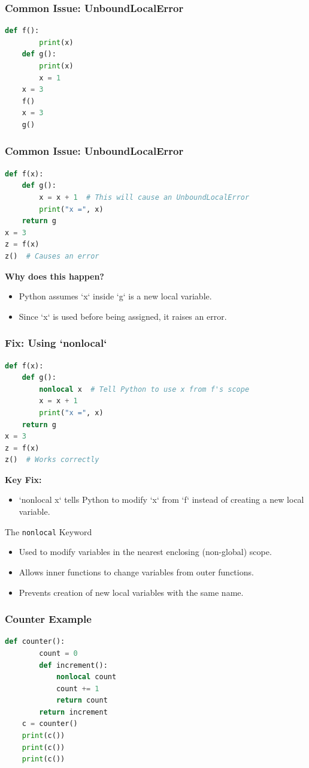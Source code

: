 \begin{frame}[fragile]
    \frametitle{Common Issue: UnboundLocalError}
    \begin{lstlisting}[language=Python]
    def f():
        print(x)
    def g():
        print(x)
        x = 1
    x = 3
    f()
    x = 3
    g()
    \end{lstlisting}
\end{frame}
\begin{frame}[fragile]
    \frametitle{Common Issue: UnboundLocalError}
    \begin{lstlisting}[language=Python]
def f(x):
    def g():
        x = x + 1  # This will cause an UnboundLocalError
        print("x =", x)
    return g
x = 3
z = f(x)
z()  # Causes an error
    \end{lstlisting}
    \textbf{Why does this happen?}
    \begin{itemize}
        \item Python assumes `x` inside `g` is a new local variable.
        \item Since `x` is used before being assigned, it raises an error.
    \end{itemize}
\end{frame}


\begin{frame}[fragile]
    \frametitle{Fix: Using `nonlocal`}
    \begin{lstlisting}[language=Python]
def f(x):
    def g():
        nonlocal x  # Tell Python to use x from f's scope
        x = x + 1
        print("x =", x)
    return g
x = 3
z = f(x)
z()  # Works correctly
    \end{lstlisting}
    \textbf{Key Fix:}
    \begin{itemize}
        \item `nonlocal x` tells Python to modify `x` from `f` instead of creating a new local variable.
    \end{itemize}
\end{frame}


  \begin{frame}{The \texttt{nonlocal} Keyword}
    \begin{itemize}
      \item Used to modify variables in the nearest enclosing (non-global) scope.
      \item Allows inner functions to change variables from outer functions.
      \item Prevents creation of new local variables with the same name.
    \end{itemize}
  \end{frame}

  \begin{frame}[fragile]
    \frametitle{Counter Example}
    \begin{lstlisting}[language=Python]
    def counter():
        count = 0
        def increment():
            nonlocal count
            count += 1
            return count
        return increment
    c = counter()
    print(c())
    print(c())
    print(c())
    \end{lstlisting}
  \end{frame}